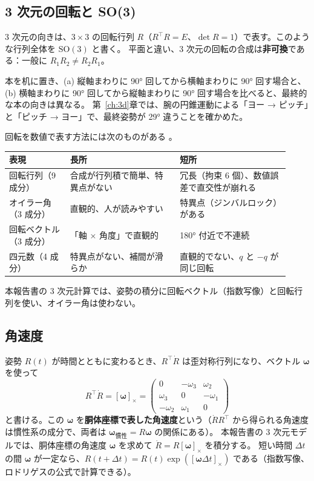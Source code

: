 \subsection{3 次元の回転と SO(3)}

3 次元の向きは、$3\times3$ の回転行列 $R$（$R^\top R = E$、$\det R = 1$）で表す。このような行列全体を $\mathrm{SO}(3)$ と書く。
平面と違い、3 次元の回転の合成は\textbf{非可換}である：一般に $R_1R_2 \neq R_2R_1$。

\begin{example}[回転の順序]
本を机に置き、(a) 縦軸まわりに 90° 回してから横軸まわりに 90° 回す場合と、
(b) 横軸まわりに 90° 回してから縦軸まわりに 90° 回す場合を比べると、最終的な本の向きは異なる。
第~\ref{ch:3d}章では、腕の円錐運動による「ヨー → ピッチ」と「ピッチ → ヨー」で、最終姿勢が 29° 違うことを確かめた。
\end{example}

回転を数値で表す方法には次のものがある \cite{R18}。
\begin{longtable}{p{0.20\linewidth}p{0.36\linewidth}p{0.36\linewidth}}
\toprule
表現 & 長所 & 短所 \\ \midrule \endhead
回転行列（9 成分） & 合成が行列積で簡単、特異点がない & 冗長（拘束 6 個）、数値誤差で直交性が崩れる \\
オイラー角（3 成分） & 直観的、人が読みやすい & 特異点（ジンバルロック）がある \\
回転ベクトル（3 成分） & 「軸 × 角度」で直観的 & 180° 付近で不連続 \\
四元数（4 成分） & 特異点がない、補間が滑らか & 直観的でない、$q$ と $-q$ が同じ回転 \\
\bottomrule
\end{longtable}
本報告書の 3 次元計算では、姿勢の積分に回転ベクトル（指数写像）と回転行列を使い、オイラー角は使わない。

\subsection{角速度}

姿勢 $R(t)$ が時間とともに変わるとき、$R^\top\dot R$ は歪対称行列になり、ベクトル $\bm\omega$ を使って
\begin{equation}
R^\top\dot R = [\bm\omega]_\times = \begin{pmatrix}0&-\omega_3&\omega_2\\ \omega_3&0&-\omega_1\\ -\omega_2&\omega_1&0\end{pmatrix}
\end{equation}
と書ける。この $\bm\omega$ を\textbf{胴体座標で表した角速度}という（$\dot RR^\top$ から得られる角速度は慣性系の成分で、両者は $\bm\omega_{\text{慣性}} = R\bm\omega$ の関係にある）。
本報告書の 3 次元モデルでは、胴体座標の角速度 $\bm\omega$ を求めて $\dot R = R[\bm\omega]_\times$ を積分する。
短い時間 $\Delta t$ の間 $\bm\omega$ が一定なら、$R(t+\Delta t) = R(t)\exp([\bm\omega\Delta t]_\times)$ である（指数写像、ロドリゲスの公式で計算できる）。

